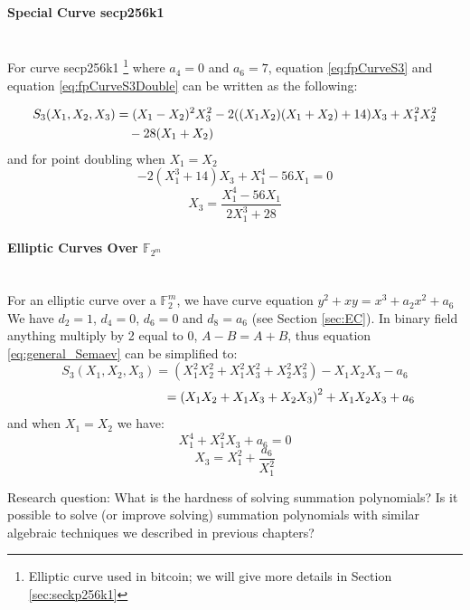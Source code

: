 \paragraph{Special Curve secp256k1} \mbox{ } \\
For curve secp256k1 \footnote{Elliptic curve used in bitcoin; we will give more details in Section \ref{sec:seckp256k1} } where $a_4 = 0$ and $a_6 = 7$, equation \ref{eq:fpCurveS3} and equation \ref{eq:fpCurveS3Double} can be written as the following:

\begin{equation} \label{eq:secp256CurveS3}
\begin{split}
S_3( X_1,X_2,X_3) &= ( X_1-X_2)^2X_3^2-2( ( X_1X_2)(X_1+X_2 ) + 14) X_3 + X_1^2X_2^2 \\
&\text{\space \space \space } - 28(X_1+X_2)
\end{split}
\end{equation}
and for point doubling when $X_1=X_2$
$$ -2\left( X_1^3 + 14\right)X_3+ X_1^4 - 56 X_1 = 0 $$
$$ X_3 = \frac{X_1^4-56X_1}{2X_1^3+28}$$

\paragraph{Elliptic Curves Over $\mathbb{F}_{2^m}$} \mbox{} \\
For an elliptic curve over a $\mathbb{F}_2^m$, we have curve equation $y^2+xy=x^3+a_2x^2+a_6$
We have $d_2=1$, $d_4=0$, $d_6=0$ and $d_8=a_6$ (see Section \ref{sec:EC}). In binary field anything multiply by 2 equal to 0, $A-B=A+B$, thus equation \ref{eq:general_Semaev} can be simplified to:
$$S_3(X_1,X_2,X_3) = (X_1^2X_2^2+X_1^2X_3^2+X_2^2X_3^2)-X_1X_2X_3-a_6$$
$$\text{\space\space\space\space\space\space\space\space\space\space\space\space\space\space\space\space\space\space\space\space\space\space\space\space\space\space} = \left( X_1X_2+X_1X_3+X_2X_3 \right) ^2 + X_1X_2X_3+a_6$$
and when $X_1=X_2$ we have:
$$X_1^4+X_1^2X_3+a_6=0$$
$$X_3=X_1^2+\frac{a_6}{X_1^2}$$

Research question: What is the hardness of solving summation polynomials? Is it possible to solve (or improve solving) summation polynomials with similar algebraic techniques we described in previous chapters?

